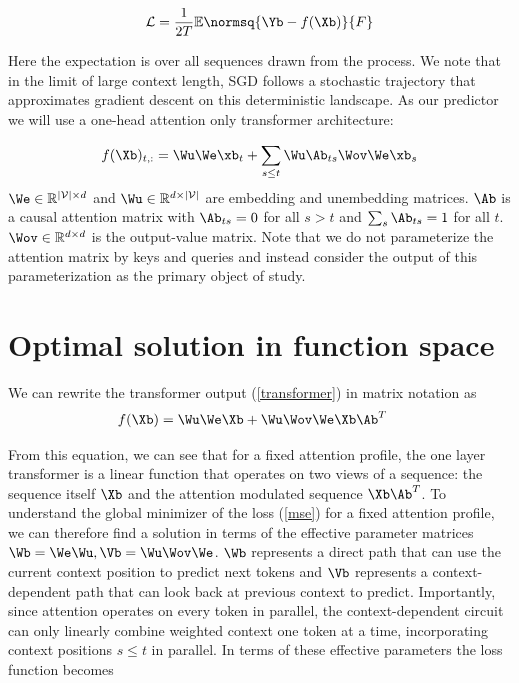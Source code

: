 \documentclass{article}
\begin{document}
\begin{equation}\label{mse}
    \mathcal{L} = \frac{1}{2T} \mathbb{E}\normsq{\Yb - f(\Xb)}{F}
\end{equation}

Here the expectation is over all sequences drawn from the process. We note that in the limit of large context length, SGD follows a stochastic trajectory that approximates gradient descent on this deterministic landscape. As our predictor we will use a one-head attention only transformer architecture: 

\begin{equation}\label{transformer}
    f(\Xb)_{t,:} = \Wu\We \xb_t + \sum_{s \le t} \Wu \Ab_{ts}\Wov\We \xb_s
\end{equation}
$\We \in \mathbb{R}^{|\mathcal{V}| \times d}$ and $\Wu \in \mathbb{R}^{d \times |\mathcal{V}|}$ are embedding and unembedding matrices. $\Ab$ is a causal attention matrix with $\Ab_{ts} = 0$ for all $s > t$ and $\sum_{s} \Ab_{ts} = 1$ for all $t$. $\Wov \in \mathbb{R}^{d \times d}$ is the output-value matrix. Note that we do not parameterize the attention matrix by keys and queries and instead consider the output of this parameterization as the primary object of study. 

\section{Optimal solution in function space}
We can rewrite the transformer output (\ref{transformer}) in matrix notation as
\begin{align}\label{transformer_matrix}
     f(\Xb) &= \Wu\We \Xb + \Wu \Wov\We \Xb \Ab^T
\end{align}

From this equation, we can see that for a fixed attention profile, the one layer transformer is a linear function that operates on two views of a sequence: the sequence itself $\Xb$ and the attention modulated sequence $\Xb\Ab^T$. To understand the global minimizer of the loss (\ref{mse}) for a fixed attention profile, we can therefore find a solution in terms of the effective parameter matrices $\Wb = \We\Wu, \Vb = \Wu \Wov\We$. $\Wb$ represents a direct path that can use the current context position to predict next tokens and $\Vb$ represents a context-dependent path that can look back at previous context to predict. Importantly, since attention operates on every token in parallel, the context-dependent circuit can only linearly combine weighted context one token at a time, incorporating context positions $s \le t$ in parallel. In terms of these effective parameters the loss function becomes
\end{document}
